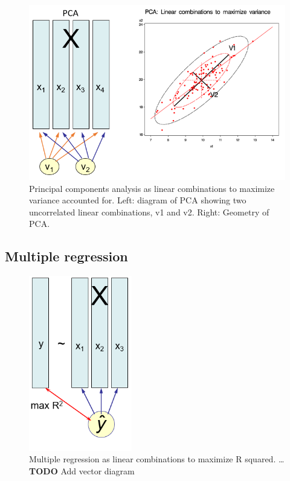 \documentclass[
  letterpaper,
  10pt,
  krantz2]{krantz}
\begin{document}
\begin{figure}

{\centering \includegraphics[width=1\textwidth,height=\textheight]{images/lin-comb-pca.png}

}

\caption{\label{fig-lin-comb-pca}Principal components analysis as linear
combinations to maximize variance accounted for. Left: diagram of PCA
showing two uncorrelated linear combinations, v1 and v2. Right: Geometry
of PCA.}

\end{figure}

\hypertarget{multiple-regression}{%
\subsection{Multiple regression}\label{multiple-regression}}

\begin{figure}

{\centering \includegraphics[width=0.4\textwidth,height=\textheight]{images/lin-comb2.png}

}

\caption{\label{fig-lin-comb2}Multiple regression as linear combinations
to maximize R squared. \ldots{} \textbf{TODO} Add vector diagram}

\end{figure}
\end{document}
